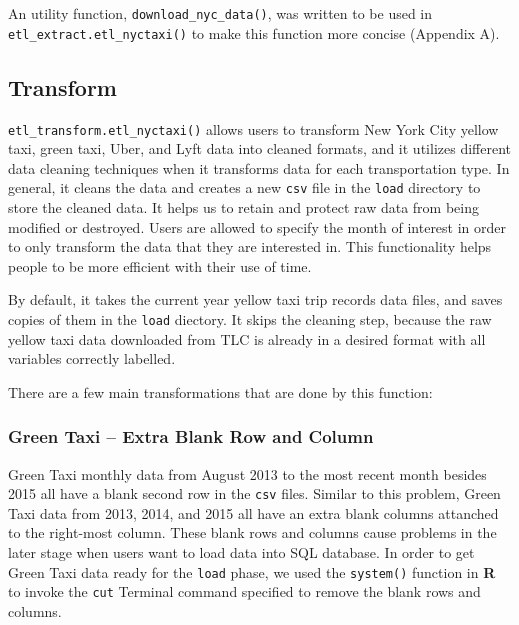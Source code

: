 \documentclass[12pt,twoside]{reedthesis}
\newenvironment{Shaded}{\begin{snugshade}}{\end{snugshade}}
\newcommand{\KeywordTok}[1]{\textcolor[rgb]{0.13,0.29,0.53}{\textbf{#1}}}
\newcommand{\DataTypeTok}[1]{\textcolor[rgb]{0.13,0.29,0.53}{#1}}
\newcommand{\DecValTok}[1]{\textcolor[rgb]{0.00,0.00,0.81}{#1}}
\newcommand{\StringTok}[1]{\textcolor[rgb]{0.31,0.60,0.02}{#1}}
\newcommand{\OperatorTok}[1]{\textcolor[rgb]{0.81,0.36,0.00}{\textbf{#1}}}
\newcommand{\NormalTok}[1]{#1}
\theoremstyle{definition}
\theoremstyle{definition}
\theoremstyle{definition}
\theoremstyle{remark}
\begin{document}
An utility function, \texttt{download\_nyc\_data()}, was written to be
used in \texttt{etl\_extract.etl\_nyctaxi()} to make this function more
concise (Appendix A).

\subsection{Transform}\label{transform}

\texttt{etl\_transform.etl\_nyctaxi()} allows users to transform New
York City yellow taxi, green taxi, Uber, and Lyft data into cleaned
formats, and it utilizes different data cleaning techniques when it
transforms data for each transportation type. In general, it cleans the
data and creates a new \texttt{csv} file in the \texttt{load} directory
to store the cleaned data. It helps us to retain and protect raw data
from being modified or destroyed. Users are allowed to specify the month
of interest in order to only transform the data that they are interested
in. This functionality helps people to be more efficient with their use
of time.

By default, it takes the current year yellow taxi trip records data
files, and saves copies of them in the \texttt{load} diectory. It skips
the cleaning step, because the raw yellow taxi data downloaded from TLC
is already in a desired format with all variables correctly labelled.
\begin{Shaded}
\end{Shaded}
There are a few main transformations that are done by this function:

\subsubsection{Green Taxi -- Extra Blank Row and
Column}\label{green-taxi-extra-blank-row-and-column}

Green Taxi monthly data from August 2013 to the most recent month
besides 2015 all have a blank second row in the \texttt{csv} files.
Similar to this problem, Green Taxi data from 2013, 2014, and 2015 all
have an extra blank columns attanched to the right-most column. These
blank rows and columns cause problems in the later stage when users want
to load data into SQL database. In order to get Green Taxi data ready
for the \texttt{load} phase, we used the \texttt{system()} function in
\textbf{R} to invoke the \texttt{cut} Terminal command specified to
remove the blank rows and columns.
\end{document}
